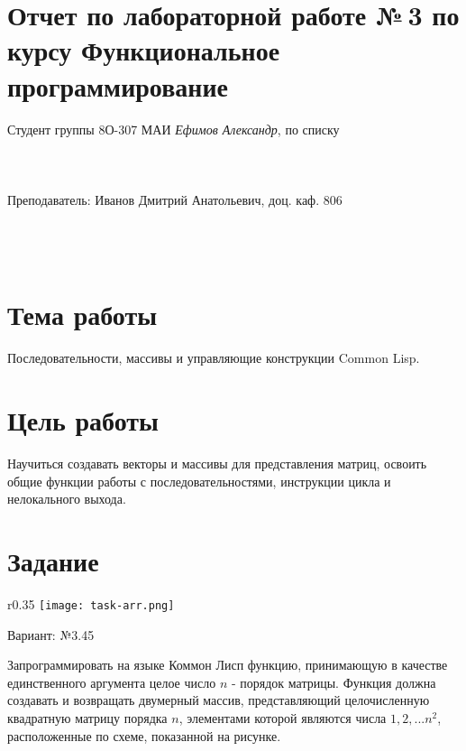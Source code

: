 \documentclass[12pt]{article}
\begin{document}
\section*{Отчет по лабораторной работе №\,3 
по курсу \guillemotleft  Функциональное программирование\guillemotright}
\begin{flushright}
Студент группы 8О-307 МАИ \textit{Ефимов Александр},  по списку \\
 \\
 \\
\ \\
Преподаватель: Иванов Дмитрий Анатольевич, доц. каф. 806 \\
 \\
 \\
 \\

\end{flushright}

\section{Тема работы}
Последовательности, массивы и управляющие конструкции Common Lisp.

\section{Цель работы}
Научиться создавать векторы и массивы для представления матриц, освоить общие функции работы с последовательностями, инструкции цикла и нелокального выхода.

\section{Задание}

\begin{wrapfigure}{r}{0.35\textwidth}
    \centering
    \texttt{[image: task-arr.png]}
\end{wrapfigure}

Вариант: №3.45

Запрограммировать на языке Коммон Лисп функцию, принимающую в качестве 
единственного аргумента целое число $n$ - порядок матрицы. Функция должна 
создавать и возвращать двумерный массив, представляющий целочисленную 
квадратную матрицу порядка $n$, элементами которой являются числа $1, 2, ... n^2$, 
расположенные по схеме, показанной на рисунке.
\end{document}
